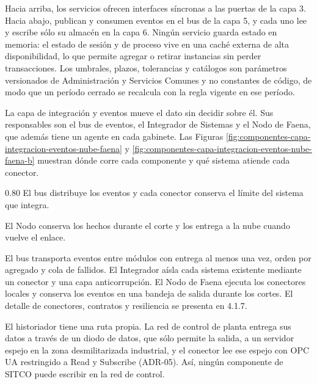 \documentclass[subdoc]{../../comun/overfore}
\begin{document}
Hacia arriba, los servicios ofrecen interfaces síncronas a las puertas de la capa 3. Hacia abajo, publican y consumen eventos en el bus de la capa 5, y cada uno lee y escribe sólo su almacén en la capa 6. Ningún servicio guarda estado en memoria: el estado de sesión y de proceso vive en una caché externa de alta disponibilidad, lo que permite agregar o retirar instancias sin perder transacciones. Los umbrales, plazos, tolerancias y catálogos son parámetros versionados de Administración y Servicios Comunes y no constantes de código, de modo que un período cerrado se recalcula con la regla vigente en ese período.

La capa de integración y eventos mueve el dato sin decidir sobre él. Sus responsables son el bus de eventos, el Integrador de Sistemas y el Nodo de Faena, que además tiene un agente en cada gabinete. Las Figuras \ref{fig:componentes-capa-integracion-eventos-nube-faena} y \ref{fig:componentes-capa-integracion-eventos-nube-faena-b} muestran dónde corre cada componente y qué sistema atiende cada conector.

\begin{horizontal}
\expandafter\def\csname ov@altofig\endcsname{0.80}
\begingroup
\def\thefigure{4.6a}
\def\theHfigure{4.6a}
\endgroup
El bus distribuye los eventos y cada conector conserva el límite del sistema que integra.

\clearpage
\addtocounter{figure}{-1}
\begingroup
\def\thefigure{4.6b}
\def\theHfigure{4.6b}
\endgroup
El Nodo conserva los hechos durante el corte y los entrega a la nube cuando vuelve el enlace.

\end{horizontal}
El bus transporta eventos entre módulos con entrega al menos una vez, orden por agregado y cola de fallidos. El Integrador aísla cada sistema existente mediante un conector y una capa anticorrupción. El Nodo de Faena ejecuta los conectores locales y conserva los eventos en una bandeja de salida durante los cortes. El detalle de conectores, contratos y resiliencia se presenta en 4.1.7.

El historiador tiene una ruta propia. La red de control de planta entrega sus datos a través de un diodo de datos, que sólo permite la salida, a un servidor espejo en la zona desmilitarizada industrial, y el conector lee ese espejo con OPC UA restringido a Read y Subscribe (ADR-05). Así, ningún componente de SITCO puede escribir en la red de control.
\end{document}
